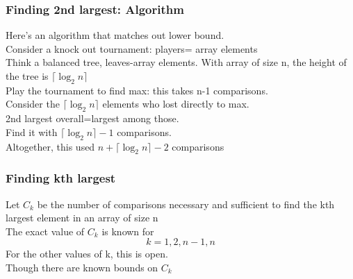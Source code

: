 \documentclass{article}[18pt]
\begin{document}
\subsubsection{Finding 2nd largest: Algorithm}
Here's an algorithm that matches out lower bound.\\
Consider a knock out tournament: players= array elements\\
Think a balanced tree, leaves-array elements. With array of size n, the height of the tree is $\lceil \log_2 n\rceil$\\
Play the tournament to find max: this takes n-1 comparisons.\\
Consider the $\lceil \log_2 n\rceil$ elements who lost directly to max.\\
2nd largest overall=largest among those.\\
Find it with $\lceil \log_2 n\rceil-1$ comparisons.\\
Altogether, this used $n+\lceil\log_2 n\rceil -2$ comparisons
\subsubsection{Finding kth largest}
Let $C_k$ be the number of comparisons necessary and sufficient to find the kth largest element in an array of size n\\
The exact value of $C_k$ is known for
$$k=1,2,n-1,n$$
For the other values of k, this is open.\\
Though there are known bounds on $C_k$
\end{document}

